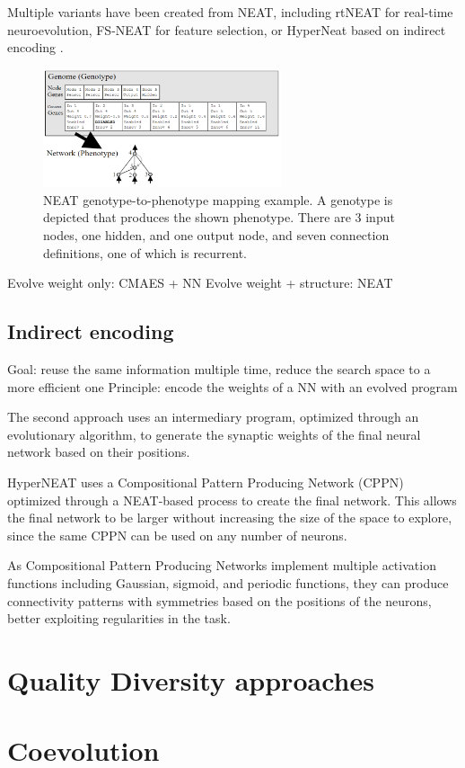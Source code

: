 Multiple variants have been created from NEAT, including rtNEAT \cite{rtNEAT} for real-time neuroevolution, FS-NEAT \cite{FS-NEAT} for feature selection, or HyperNeat based on indirect encoding \cite{HyperNEAT}.

\begin{figure}[H]
 \centering
 \captionsetup{justification=centering, margin=0.5cm}
 \includegraphics[width=7cm]{images/neat.png}
 \caption{\label{NEAT}NEAT genotype-to-phenotype mapping example. A genotype is depicted that produces the shown phenotype. There are 3 input nodes, one hidden, and one output node, and seven connection definitions, one of which is recurrent. \cite{NEAT_2}}
 \label{fig:NEAT}
\end{figure}


Evolve weight only: CMAES + NN
Evolve weight + structure: NEAT

\subsection{Indirect encoding}
Goal: reuse the same information multiple time, reduce the search space to a more efficient one
Principle: encode the weights of a NN with an evolved program

The second approach uses an intermediary program, optimized through an evolutionary algorithm, to generate the synaptic weights of the final neural network based on their positions. 

HyperNEAT \cite{HyperNEAT} uses a Compositional Pattern Producing Network (CPPN) \cite{CPPN} optimized through a NEAT-based process to create the final network. This allows the final network to be larger without increasing the size of the space to explore, since the same CPPN can be used on any number of neurons.

As Compositional Pattern Producing Networks implement multiple activation functions including Gaussian, sigmoid, and periodic functions, they can produce connectivity patterns with symmetries based on the positions of the neurons, better exploiting regularities in the task.

\section{Quality Diversity approaches}

\section{Coevolution}

